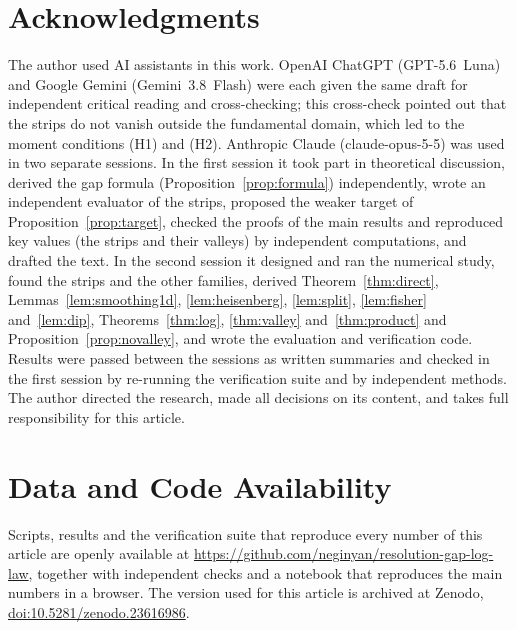\section*{Acknowledgments}
The author used AI assistants in this work. OpenAI ChatGPT (\mbox{GPT-5.6 Luna}) and Google Gemini (\mbox{Gemini 3.8 Flash}) were each given the same draft for independent critical reading and cross-checking; this cross-check pointed out that the strips do not vanish outside the fundamental domain, which led to the moment conditions (H1) and (H2). Anthropic Claude (\mbox{claude-opus-5-5}) was used in two separate sessions. In the first session it took part in theoretical discussion, derived the gap formula (Proposition~\ref{prop:formula}) independently, wrote an independent evaluator of the strips, proposed the weaker target of Proposition~\ref{prop:target}, checked the proofs of the main results and reproduced key values (the strips and their valleys) by independent computations, and drafted the text. In the second session it designed and ran the numerical study, found the strips and the other families, derived Theorem~\ref{thm:direct}, Lemmas~\ref{lem:smoothing1d}, \ref{lem:heisenberg}, \ref{lem:split}, \ref{lem:fisher} and~\ref{lem:dip}, Theorems~\ref{thm:log}, \ref{thm:valley} and~\ref{thm:product} and Proposition~\ref{prop:novalley}, and wrote the evaluation and verification code. Results were passed between the sessions as written summaries and checked in the first session by re-running the verification suite and by independent methods. The author directed the research, made all decisions on its content, and takes full responsibility for this article.

\section*{Data and Code Availability}
Scripts, results and the verification suite that reproduce every number of this article are openly available at \url{https://github.com/neginyan/resolution-gap-log-law}, together with independent checks and a notebook that reproduces the main numbers in a browser. The version used for this article is archived at Zenodo, \href{https://doi.org/10.5281/zenodo.23616986}{doi:10.5281/zenodo.23616986}.
